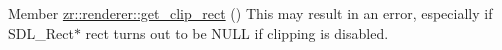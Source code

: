 
\begin{DoxyRefList}
\item[Member \mbox{\hyperlink{classzr_1_1renderer_a1a93b15028f2bc27b2051bc912a70b4b}{zr::renderer::get\+\_\+clip\+\_\+rect}} ()]\label{todo__todo000002}%
%
This may result in an error, especially if S\+D\+L\+\_\+\+Rect$\ast$ rect turns out to be N\+U\+LL if clipping is disabled. 
\end{DoxyRefList}